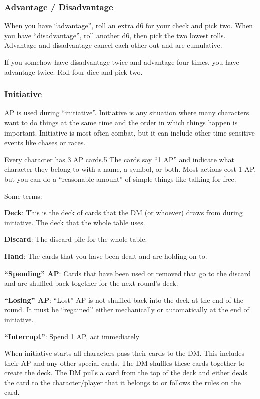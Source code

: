 \documentclass[
  letterpaper,
  DIV=11,
  numbers=noendperiod]{scrartcl}
\begin{document}
\subsubsection{Advantage / Disadvantage}\label{advantage-disadvantage}

When you have ``advantage'', roll an extra d6 for your check and pick
two. When you have ``disadvantage'', roll another d6, then pick the two
lowest rolls. Advantage and disadvantage cancel each other out and are
cumulative.

If you somehow have disadvantage twice and advantage four times, you
have advantage twice. Roll four dice and pick two.

\subsubsection{Initiative}\label{initiative}

AP is used during ``initiative''. Initiative is any situation where many
characters want to do things at the same time and the order in which
things happen is important. Initiative is most often combat, but it can
include other time sensitive events like chases or races.

Every character has 3 AP cards.5 The cards say ``1 AP'' and indicate
what character they belong to with a name, a symbol, or both. Most
actions cost 1 AP, but you can do a ``reasonable amount'' of simple
things like talking for free.

Some terms:

\textbf{Deck}: This is the deck of cards that the DM (or whoever) draws
from during initiative. The deck that the whole table uses.

\textbf{Discard}: The discard pile for the whole table.

\textbf{Hand}: The cards that you have been dealt and are holding on to.

\textbf{``Spending'' AP}: Cards that have been used or removed that go
to the discard and are shuffled back together for the next round's deck.

\textbf{``Losing'' AP}: ``Lost'' AP is not shuffled back into the deck
at the end of the round. It must be ``regained'' either mechanically or
automatically at the end of initiative.

\textbf{``Interrupt''}: Spend 1 AP, act immediately

When initiative starts all characters pass their cards to the DM. This
includes their AP and any other special cards. The DM shuffles these
cards together to create the deck. The DM pulls a card from the top of
the deck and either deals the card to the character/player that it
belongs to or follows the rules on the card.
\end{document}
